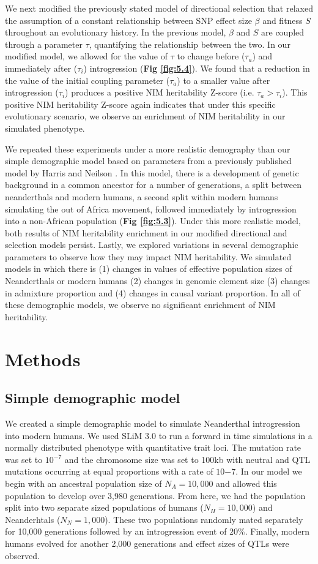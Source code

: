 We next modified the previously stated model of directional selection that relaxed the assumption of a constant relationship between SNP effect size $\beta$ and fitness $S$ throughout an evolutionary history. In the previous model, $\beta$ and $S$ are coupled through a parameter $\tau$, quantifying the relationship between the two. In our modified model, we allowed for the value of $\tau$ to change before ($\tau_a$) and immediately after ($\tau_i$) introgression (\textbf{Fig \ref{fig:5.4}}). We found that a reduction in the value of the initial coupling parameter ($\tau_a$) to a smaller value after introgression ($\tau_i$) produces a positive NIM heritability Z-score (i.e. $\tau_a > \tau_i$). This positive NIM heritability Z-score again indicates that under this specific evolutionary scenario, we observe an enrichment of NIM heritability in our simulated phenotype.

We repeated these experiments under a more realistic demography than our simple demographic model based on parameters from a previously published model by Harris and Neilson \cite{harris2016genetic}. In this model, there is a development of genetic background in a common ancestor for a number of generations, a split between neanderthals and modern humans, a second split within modern humans simulating the out of Africa movement, followed immediately by introgression into a non-African population (\textbf{Fig \ref{fig:5.3}}). Under this more realistic model, both results of NIM heritability enrichment in our modified directional and selection models persist. Lastly, we explored variations in several demographic parameters to observe how they may impact NIM heritability. We simulated models in which there is (1) changes in values of effective population sizes of Neanderthals or modern humans (2) changes in genomic element size (3) changes in admixture proportion and (4) changes in causal variant proportion. In all of these demographic models, we observe no significant enrichment of NIM heritability. 

\section{Methods}
\subsection{Simple demographic model}
We created a simple demographic model to simulate Neanderthal introgression into modern humans. We used SLiM 3.0 \cite{haller2019slim} to run a forward in time simulations in a normally distributed phenotype with quantitative trait loci. The mutation rate was set to $10^{-7}$ and the chromosome size was set to 100kb with neutral and QTL mutations occurring at equal proportions with a rate of $10{-7}$. In our model we begin with an ancestral population size of $N_A = 10,000$ and allowed this population to develop over 3,980 generations. From here, we had the population split into two separate sized populations of humans ($N_H = 10,000$) and Neanderhtals ($N_N = 1,000$). These two populations randomly mated separately for 10,000 generations followed by an introgression event of $20\%$. Finally, modern humans evolved for another 2,000 generations and effect sizes of QTLs were observed. 

